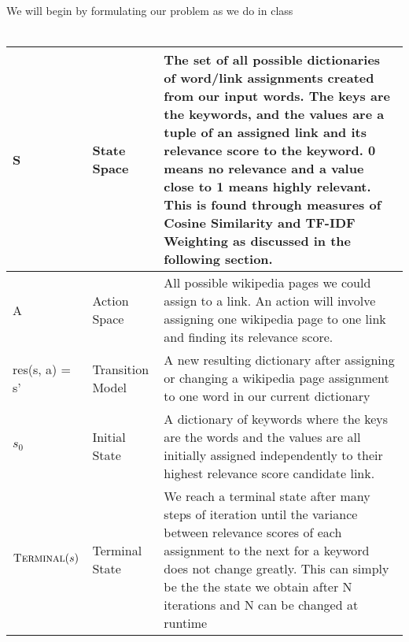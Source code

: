 \documentclass[twoside,11pt]{article}
\begin{document}
We will begin by formulating our problem as we do in class
\\ \\
\begin{tabular}{|p{3cm}|p{3cm}|p{9cm}|}
\hline
S              & State Space      & The set of all possible dictionaries of word/link assignments created from our input words. The keys are the keywords, and the values are a tuple of an assigned link and its relevance score to the keyword. 0 means no relevance and a value close to 1 means highly relevant. This is found through measures of Cosine Similarity and TF-IDF Weighting as discussed in the following section. \\ \hline
A              & Action Space     & All possible wikipedia pages we could assign to a link. An action will involve assigning one wikipedia page to one link and finding its relevance score.                                                                                                                                                                                                                                                                                                                                                                                           \\ \hline
res(s, a) = s' & Transition Model & A new resulting dictionary after assigning or changing a wikipedia page assignment to one word in our current dictionary                                                                                                                                                                                                                                                                                                                                                                                          \\ \hline
$s_0$             & Initial State    & A dictionary of keywords where the keys are the words and the values are all initially assigned independently to their highest relevance score candidate link.                                                                                                                                                                                                                                                                                                                                                                                    \\ \hline
$\mbox{\sc Terminal}(s)$             & Terminal State    & We reach a terminal state after many steps of iteration until the variance between relevance scores of each assignment to the next for a keyword does not change greatly. This can simply be the the state we obtain after N iterations and N can be changed at runtime                                                                                                                                                                                                                                                                                                                                                                                    \\ \hline
\end{tabular}
\end{document}
